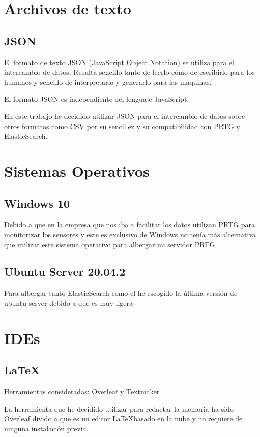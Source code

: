 \section{Archivos de texto}
\subsection{JSON}
El formato de texto JSON (JavaScript Object Notation) se utiliza para el intercambio de datos. Resulta sencillo tanto de leerlo cómo de escribirlo para los humanos y sencillo de interpretarlo y generarlo para las máquinas.

El formato JSON es independiente del lenguaje JavaScript.

En este trabajo he decidido utilizar JSON para el intercambio de datos sobre otros formatos como CSV por su sencillez y su compatibilidad con PRTG y ElasticSearch.\cite{pagina:JSON}




\section{Sistemas Operativos}

\subsection{Windows 10}
Debido a que en la empresa que nos iba a facilitar los datos utilizan PRTG para monitorizar los sensores y este es exclusivo de Windows no tenía más alternativa que utilizar este sistema operativo para albergar mi servidor PRTG.

\subsection{Ubuntu Server 20.04.2}
Para albergar tanto ElasticSearch como el he escogido la última versión de ubuntu server debido a que es muy ligera 
\section{IDEs}

\subsection{\LaTeX}
Herramientas consideradas: Overleaf y Textmaker

La herramienta que he decidido utilizar para redactar la memoria ha sido Overleaf divido a que es un editor \LaTeX basado en la nube y no requiere de ninguna instalación previa.

